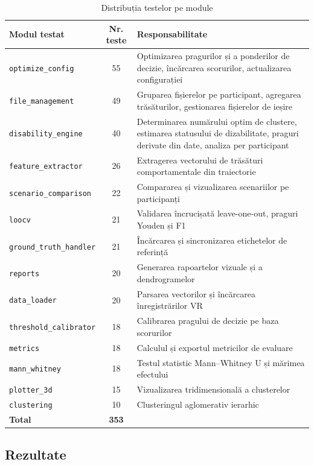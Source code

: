 \begin{table}[ht]
\centering
\caption{Distribuția testelor pe module}
\label{tab:teste}
\small
\begin{tabular}{l c p{6.5cm}}
\hline
\textbf{Modul testat} & \textbf{Nr. teste} & \textbf{Responsabilitate} \\
\hline
\texttt{optimize\_config}     & 55 & Optimizarea pragurilor și a ponderilor de decizie, încărcarea scorurilor, actualizarea configurației \\
\texttt{file\_management}     & 49 & Gruparea fișierelor pe participant, agregarea trăsăturilor, gestionarea fișierelor de ieșire \\
\texttt{disability\_engine}   & 40 & Determinarea numărului optim de clustere, estimarea statusului de dizabilitate, praguri derivate din date, analiza per participant \\
\texttt{feature\_extractor}   & 26 & Extragerea vectorului de trăsături comportamentale din traiectorie \\
\texttt{scenario\_comparison} & 22 & Compararea și vizualizarea scenariilor pe participanți \\
\texttt{loocv}                & 21 & Validarea încrucișată leave-one-out, praguri Youden și F1 \\
\texttt{ground\_truth\_handler} & 21 & Încărcarea și sincronizarea etichetelor de referință \\
\texttt{reports}              & 20 & Generarea rapoartelor vizuale și a dendrogramelor \\
\texttt{data\_loader}         & 20 & Parsarea vectorilor și încărcarea înregistrărilor VR \\
\texttt{threshold\_calibrator}& 18 & Calibrarea pragului de decizie pe baza scorurilor \\
\texttt{metrics}              & 18 & Calculul și exportul metricilor de evaluare \\
\texttt{mann\_whitney}        & 18 & Testul statistic Mann--Whitney U și mărimea efectului \\
\texttt{plotter\_3d}          & 15 & Vizualizarea tridimensională a clusterelor \\
\texttt{clustering}           & 10 & Clusteringul aglomerativ ierarhic \\
\hline
\textbf{Total}                & \textbf{353} & \\
\hline
\end{tabular}
\end{table}

\subsection{Rezultate}

